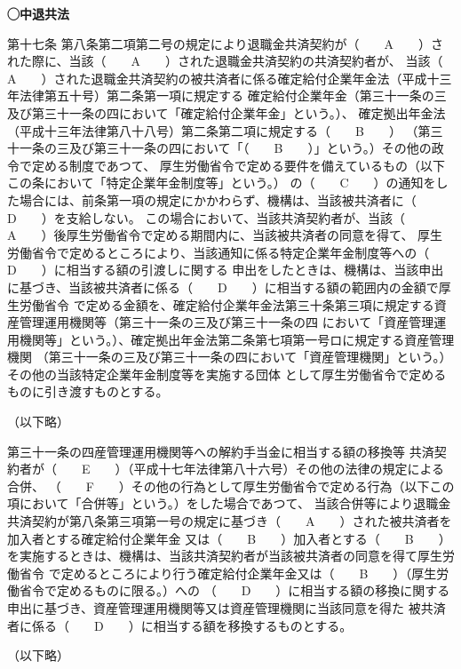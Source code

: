 \begin{fillblank}[数理人試験 H28 問題1 設問6]
  \noindent \textbf{◯中退共法}
  \begin{lawstructure}
    \begin{lawarticle}{第十七条}{}
      第八条第二項第二号の規定により退職金共済契約が（　　A　　）された際に、当該（　　A　　）された退職金共済契約の共済契約者が、
      当該（　　A　　）された退職金共済契約の被共済者に係る確定給付企業年金法（平成十三年法律第五十号）第二条第一項に規定する
      確定給付企業年金（第三十一条の三及び第三十一条の四において「確定給付企業年金」という。）、
      確定拠出年金法（平成十三年法律第八十八号）第二条第二項に規定する（　　B　　）
      （第三十一条の三及び第三十一条の四において「（　　B　　）」という。）その他の政令で定める制度であつて、
      厚生労働省令で定める要件を備えているもの（以下この条において「特定企業年金制度等」という。）
      の（　　C　　）の通知をした場合には、前条第一項の規定にかかわらず、機構は、当該被共済者に（　　D　　）を支給しない。
      この場合において、当該共済契約者が、当該（　　A　　）後厚生労働省令で定める期間内に、当該被共済者の同意を得て、
      厚生労働省令で定めるところにより、当該通知に係る特定企業年金制度等への（　　D　　）に相当する額の引渡しに関する
      申出をしたときは、機構は、当該申出に基づき、当該被共済者に係る（　　D　　）に相当する額の範囲内の金額で厚生労働省令
      で定める金額を、確定給付企業年金法第三十条第三項に規定する資産管理運用機関等（第三十一条の三及び第三十一条の四
      において「資産管理運用機関等」という。）、確定拠出年金法第二条第七項第一号ロに規定する資産管理機関
      （第三十一条の三及び第三十一条の四において「資産管理機関」という。）その他の当該特定企業年金制度等を実施する団体
      として厚生労働省令で定めるものに引き渡すものとする。

      （以下略）
    \end{lawarticle}

    \begin{lawarticle}{第三十一条の四}{産管理運用機関等への解約手当金に相当する額の移換等}
      共済契約者が（　　E　　）（平成十七年法律第八十六号）その他の法律の規定による合併、
      （　　F　　）その他の行為として厚生労働省令で定める行為（以下この項において「合併等」という。）をした場合であつて、
      当該合併等により退職金共済契約が第八条第三項第一号の規定に基づき（　　A　　）された被共済者を加入者とする確定給付企業年金
      又は（　　B　　）加入者とする（　　B　　）を実施するときは、機構は、当該共済契約者が当該被共済者の同意を得て厚生労働省令
      で定めるところにより行う確定給付企業年金又は（　　B　　）（厚生労働省令で定めるものに限る。）への
      （　　D　　）に相当する額の移換に関する申出に基づき、資産管理運用機関等又は資産管理機関に当該同意を得た
      被共済者に係る（　　D　　）に相当する額を移換するものとする。

      （以下略）
    \end{lawarticle}
  \end{lawstructure}
\end{fillblank}

